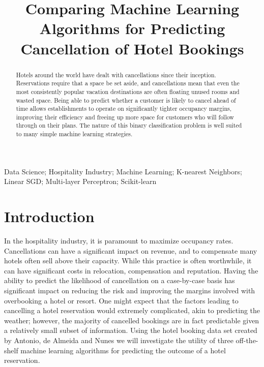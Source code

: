 \documentclass[10pt,conference]{IEEEtran}
\begin{document}
\title{Comparing Machine Learning Algorithms for Predicting Cancellation of Hotel Bookings\\}

\author{
}

\maketitle

\begin{abstract}
 Hotels around the world have dealt with cancellations since their inception. Reservations require that a space be set aside, and cancellations mean that even the most consistently popular vacation destinations are often floating unused rooms and wasted space. Being able to predict whether a customer is likely to cancel ahead of time allows establishments to operate on significantly tighter occupancy margins, improving their efficiency and freeing up more space for customers who will follow through on their plans. The nature of this binary classification problem is well suited to many simple machine learning strategies.
\end{abstract}

\begin{IEEEkeywords}
  Data Science; Hospitality Industry; Machine Learning; K-nearest Neighbors; Linear SGD; Multi-layer Perceptron; Scikit-learn
\end{IEEEkeywords}


\section{Introduction}
  In the hospitality industry, it is paramount to maximize occupancy rates. Cancellations can have a significant impact on revenue, and to compensate many hotels often sell above their capacity\cite{mehrotra_ruttley_2006}. While this practice is often worthwhile, it can have significant costs in relocation, compensation and reputation. Having the ability to predict the likelihood of cancellation on a case-by-case basis has significant impact on reducing the risk and improving the margins involved with overbooking a hotel or resort\cite{morales2010}. One might expect that the factors leading to cancelling a hotel reservation would extremely complicated, akin to predicting the weather; however, the majority of cancelled bookings are in fact predictable given a relatively small subset of information. Using the hotel booking data set created by Antonio, de Almeida and Nunes\cite{Antonio2019} we will investigate the utility of three off-the-shelf machine learning algorithms for predicting the outcome of a hotel reservation.
\end{document}
